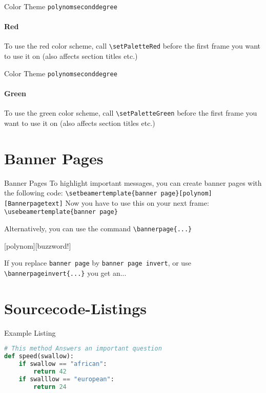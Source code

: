 \documentclass[fragile]{beamer}
\begin{document}
\setPaletteRed
\begin{frame}[fragile]{Color Theme \texttt{polynomseconddegree}}
  \framesubtitle{Red}

  To use the red color scheme, call \verb|\setPaletteRed|
  before the first frame you want to use it on (also affects
  section titles etc.)\\
  \paletteColors
  
\end{frame}

\setPaletteGreen
\begin{frame}[fragile]{Color Theme \texttt{polynomseconddegree}}
  \framesubtitle{Green}

  To use the green color scheme, call \verb|\setPaletteGreen|
  before the first frame you want to use it on (also affects
  section titles etc.) \\
  \paletteColors
  
\end{frame}
\setPaletteBlue

\section{Banner Pages}
\begin{frame}[fragile]{Banner Pages}
  To highlight important messages, you can create banner pages with the
  following code:
  \verb|\setbeamertemplate{banner page}[polynom][Bannerpagetext]|
  Now you have to use this on your next frame:
  \verb|\usebeamertemplate{banner page}|

  Alternatively, you can use the command
  \verb|\bannerpage{...}|
\end{frame}

[polynom][buzzword!]
\begin{frame}
\end{frame}

\begin{frame}[fragile]
  If you replace \verb|banner page| by
  \verb|banner page invert|, or use \verb|\bannerpageinvert{...}|
  you get an...
\end{frame}


\section{Sourcecode-Listings}
\begin{frame}[fragile]{Example Listing}
  \begin{lstlisting}[language=Python]
# This method Answers an important question
def speed(swallow):
    if swallow == "african":
        return 42
    if swalllow == "european":
        return 24
  \end{lstlisting}
\end{frame}
\end{document}
